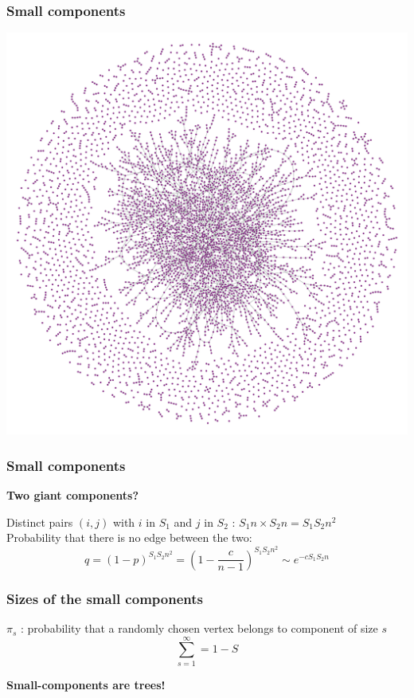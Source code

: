 \documentclass{beamer}
\begin{document}
\begin{frame}
    \frametitle{Small components}

    \centering
        \includegraphics[width=0.8\columnwidth]{er_large.pdf}
\end{frame}
\begin{frame}
    \frametitle{Small components}
    \centering
    {\bf Two giant components?}\\
    \justifying
    \vspace{2em}

    Distinct pairs $(i, j)$ with $i$ in $S_1$ and $j$ in $S_2$ : $S_1n\times S_2n = S_1S_2n^2$\\
    \vspace{2em}
    Probability that there is no edge between the two:
    $$q = (1-p)^{S_1S_2n^2} = \left(1-\frac{c}{n-1}\right)^{S_1S_2n^2} \sim e^{-cS_1S_2n}$$
\end{frame}
\begin{frame}
    \frametitle{Sizes of the small components}
    \centering
    $\pi_s$ : probability that a randomly chosen vertex belongs to component of size $s$\\
    \vspace{2em}
    $$\sum\limits_{s=1}^{\infty} = 1-S$$

    \vspace{2em}
    {\bf Small-components are trees!}
\end{frame}
\end{document}
